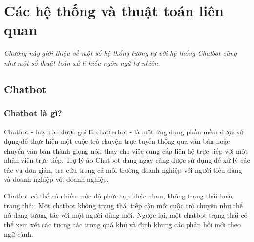 \chapter{Các hệ thống và thuật toán liên quan}
\label{Chapter2}

\emph{Chương này giới thiệu về một số hệ thống tương tự với hệ thống Chatbot cũng như một số thuật toán xử lí hiểu ngôn ngữ tự nhiên.}

\section{Chatbot}
\subsection{Chatbot là gì?}

Chatbot - hay còn được gọi là chatterbot - là một ứng dụng phần mềm được sử dụng để thực hiện một cuộc trò chuyện trực tuyến thông qua văn bản hoặc chuyển văn bản thành giọng nói, thay cho việc cung cấp liên hệ trực tiếp với một nhân viên trực tiếp. Trợ lý ảo Chatbot đang ngày càng được sử dụng để xử lý các tác vụ đơn giản, tra cứu trong cả môi trường doanh nghiệp với người tiêu dùng và doanh nghiệp với doanh nghiệp.

Chatbot có thể có nhiều mức độ phức tạp khác nhau, không trạng thái hoặc trạng thái. Một chatbot không trạng thái tiếp cận mỗi cuộc trò chuyện như thể nó đang tương tác với một người dùng mới. Ngược lại, một chatbot trạng thái có thể xem xét các tương tác trong quá khứ và định khung các phản hồi mới theo ngữ cảnh\cite{chat-bot}.


